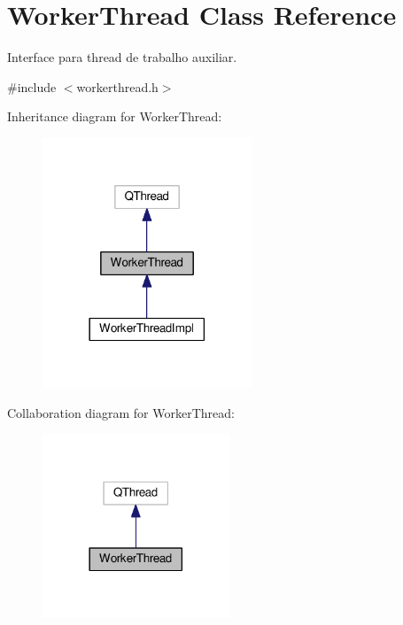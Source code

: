 \hypertarget{classWorkerThread}{}\section{Worker\+Thread Class Reference}
\label{classWorkerThread}


Interface para thread de trabalho auxiliar.  




{\ttfamily \#include $<$workerthread.\+h$>$}



Inheritance diagram for Worker\+Thread\+:\nopagebreak
\begin{figure}[H]
\begin{center}
\leavevmode
\includegraphics[width=177pt]{d3/da8/classWorkerThread__inherit__graph}
\end{center}
\end{figure}


Collaboration diagram for Worker\+Thread\+:\nopagebreak
\begin{figure}[H]
\begin{center}
\leavevmode
\includegraphics[width=158pt]{de/d07/classWorkerThread__coll__graph}
\end{center}
\end{figure}
